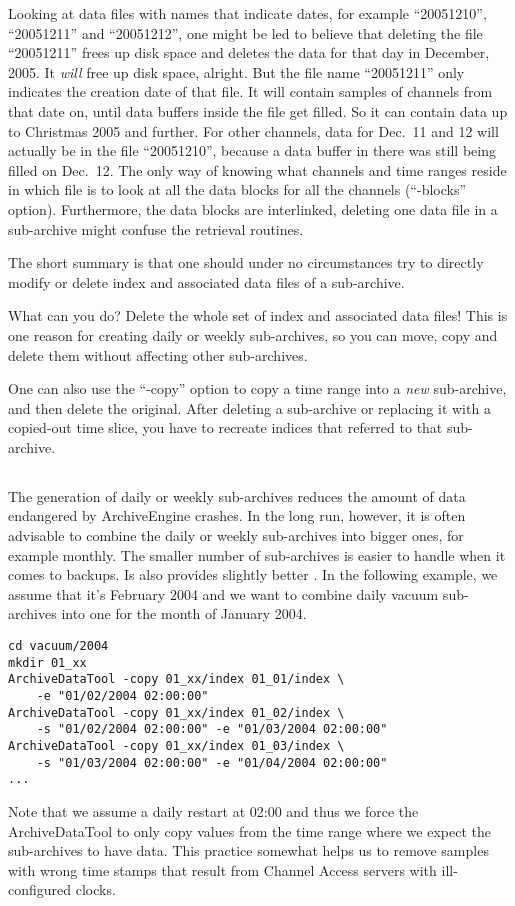 Looking at data files with names that indicate dates, for example
``20051210'', ``20051211'' and ``20051212'', one might be led to
believe that deleting the file ``20051211'' frees up disk space and
deletes the data for that day in December, 2005.  It \emph{will} free
up disk space, alright. But the file name ``20051211'' only indicates
the creation date of that file.  It will contain samples of channels
from that date on, until data buffers inside the file get filled.  So
it can contain data up to Christmas 2005 and further.  For other
channels, data for Dec.\ 11 and 12 will actually be in the file ``20051210'',
because a data buffer in there was still being filled on Dec.\ 12.
The only way of knowing what channels and time ranges reside in which
file is to look at all the data blocks for all the channels
(``-blocks'' option).  Furthermore, the data blocks are interlinked,
deleting one data file in a sub-archive might confuse the retrieval
routines.

\NOTE The short summary is that one should under no circumstances try
to directly modify or delete index and associated data files of a sub-archive.

What can you do? Delete the whole set of index and associated data
files! This is one reason for creating daily or weekly sub-archives,
so you can move, copy and delete them without affecting other
sub-archives.

One can also use the ``-copy'' option to copy a time range into a
\emph{new} sub-archive, and then delete the original.
After deleting a sub-archive or replacing it with a copied-out time
slice, you have to recreate indices that referred to that sub-archive.

\subsection{}
The generation of daily or weekly sub-archives reduces the amount of data
endangered by ArchiveEngine crashes. In the long run, however, it is often
advisable to combine the daily or weekly sub-archives into bigger ones, for
example monthly. The smaller number of sub-archives is easier to
handle when it comes to backups. Is also provides slightly better
. 
In the following example, we assume that it's February 2004 and we want
to combine daily vacuum sub-archives into one for the month of January
2004.
\begin{lstlisting}[frame=none,keywordstyle=\sffamily]
cd vacuum/2004
mkdir 01_xx
ArchiveDataTool -copy 01_xx/index 01_01/index \
    -e "01/02/2004 02:00:00"
ArchiveDataTool -copy 01_xx/index 01_02/index \
    -s "01/02/2004 02:00:00" -e "01/03/2004 02:00:00"
ArchiveDataTool -copy 01_xx/index 01_03/index \
    -s "01/03/2004 02:00:00" -e "01/04/2004 02:00:00"
...
\end{lstlisting}
\noindent Note that we assume a daily restart at 02:00 and thus we
force the ArchiveDataTool to only copy values from the time range
where we expect the sub-archives to have data. This practice somewhat
helps us to remove samples with wrong time stamps that result from
Channel Access servers with ill-configured clocks.

